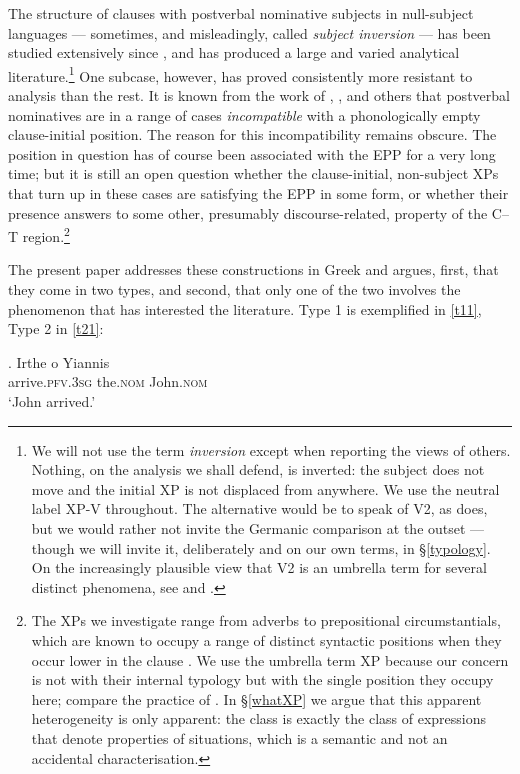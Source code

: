 \documentclass[11pt]{article}
\newcommand{\typa}{{Type 1}\xspace}
\newcommand{\typb}{{Type 2}\xspace}
\newcommand{\pfv}{\textsc{pfv}\xspace}
\begin{document}
The structure of clauses with postverbal nominative subjects in null-subject languages --- sometimes, and misleadingly, called \emph{subject inversion} --- has been studied extensively since \citet{rizzi:82}, and has produced a large and varied analytical literature.\footnote{We will not use the term \emph{inversion} except when reporting the views of others.  Nothing, on the analysis we shall defend, is inverted: the subject does not move and the initial XP is not displaced from anywhere.  We use the neutral label XP-V throughout.  The alternative would be to speak of V2, as \citet{zubizarreta:1998a} does, but we would rather not invite the Germanic comparison at the outset --- though we will invite it, deliberately and on our own terms, in \S\ref{typology}.  On the increasingly plausible view that V2 is an umbrella term for several distinct phenomena, see \citet{holmberg:13} and \citet{jouitteau:07}.}  One subcase, however, has proved consistently more resistant to analysis than the rest.  It is known from the work of \citet{zubizarreta:1998a}, \citet{pinto:97}, \citet{sheehan:06, sheehan:10} and others that postverbal nominatives are in a range of cases \emph{incompatible} with a phonologically empty clause-initial position.  The reason for this incompatibility remains obscure.  The position in question has of course been associated with the EPP for a very long time; but it is still an open question whether the clause-initial, non-subject XPs that turn up in these cases are satisfying the EPP in some form, or whether their presence answers to some other, presumably discourse-related, property of the C--T region.\footnote{The XPs we investigate range from adverbs to prepositional circumstantials, which are known to occupy a range of distinct syntactic positions when they occur lower in the clause \citep{cinque:99}.  We use the umbrella term XP because our concern is not with their internal typology but with the single position they occupy here; compare the practice of \citet{holmberg:00}.  In \S\ref{whatXP} we argue that this apparent heterogeneity is only apparent: the class is exactly the class of expressions that denote properties of situations, which is a semantic and not an accidental characterisation.}

The present paper addresses these constructions in Greek and argues, first, that they come in two types, and second, that only one of the two involves the phenomenon that has interested the literature.  \typa is exemplified in \ref{t11}, \typb in \ref{t21}:

\exg. Irthe o Yiannis\\
arrive.\pfv.3\textsc{sg} the.\textsc{nom} John.\textsc{nom}\\ \label{t11}
`John arrived.'
\end{document}
